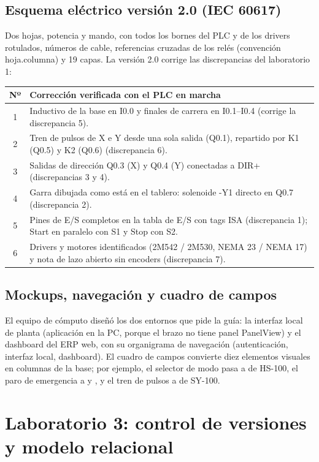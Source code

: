 \documentclass[a4paper,11pt]{article}
\begin{document}
\subsection{Esquema eléctrico versión 2.0 (IEC 60617)}
Dos hojas, potencia y mando, con todos los bornes del PLC y de los drivers rotulados, números de cable, referencias cruzadas de los relés (convención hoja.columna) y 19 capas. La versión 2.0 corrige las discrepancias del laboratorio 1:
\begin{center}\small
\begin{tabularx}{\linewidth}{c >{\raggedright\arraybackslash}X}
\toprule
\textbf{Nº} & \textbf{Corrección verificada con el PLC en marcha}\\
\midrule
1 & Inductivo de la base en I0.0 y finales de carrera en I0.1--I0.4 (corrige la discrepancia 5).\\
2 & Tren de pulsos de X e Y desde una sola salida (Q0.1), repartido por K1 (Q0.5) y K2 (Q0.6) (discrepancia 6).\\
3 & Salidas de dirección Q0.3 (X) y Q0.4 (Y) conectadas a DIR+ (discrepancias 3 y 4).\\
4 & Garra dibujada como está en el tablero: solenoide -Y1 directo en Q0.7 (discrepancia 2).\\
5 & Pines de E/S completos en la tabla de E/S con tags ISA (discrepancia 1); Start en paralelo con S1 y Stop con S2.\\
6 & Drivers y motores identificados (2M542 / 2M530, NEMA 23 / NEMA 17) y nota de lazo abierto sin encoders (discrepancia 7).\\
\bottomrule
\end{tabularx}
\end{center}

\subsection{Mockups, navegación y cuadro de campos}
El equipo de cómputo diseñó los dos entornos que pide la guía: la interfaz local de planta (aplicación en la PC, porque el brazo no tiene panel PanelView) y el dashboard del ERP web, con su organigrama de navegación (autenticación, interfaz local, dashboard). El cuadro de campos convierte diez elementos visuales en columnas de la base; por ejemplo, el selector de modo pasa a  de HS-100, el paro de emergencia a  y , y el tren de pulsos a  de SY-100.

\section{Laboratorio 3: control de versiones y modelo relacional}
\end{document}
